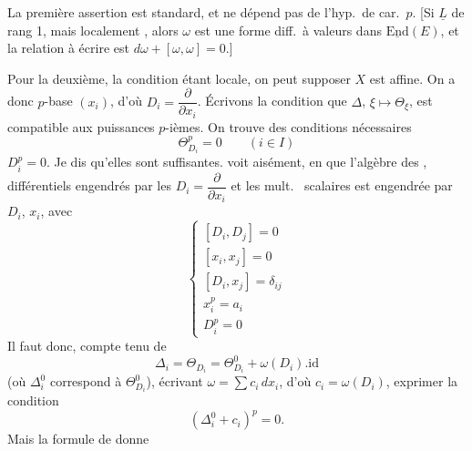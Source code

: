 \documentclass[11pt,a4paper]{article}
\begin{document}
La première assertion est standard, et ne dépend pas de l'hyp.\ de car.\ $p$. [Si $\underline{L}$   de rang 1, mais  localement , alors $\omega$ est une forme diff.\ à valeurs dans $\underline{\mathrm{End}}(E)$, et la relation à écrire est $d\omega + [\omega, \omega] = 0$.]

Pour la deuxième, la condition étant locale, on peut supposer  $X$ est affine. On a donc  \ill{} \ill{}   $p$-base $(x_{i})$, d'où  $D_{i} = \dfrac{\partial}{\partial x_{i}}$.
 Écrivons la condition que $\Delta$, \struck{\ill{}}  $\xi \mapsto \Theta_{\xi}$,  est compatible aux puissances $p$-ièmes. On trouve \struck{$\Theta_{\ill{}}$} \ill{} des conditions nécessaires
\[
\Theta_{D_{i}}^{p} = 0 \qquad (i \in I)
\]
 $D_{i}^{p} = 0$. Je dis qu'elles sont suffisantes.  \struck{\ill{}}  voit aisément, en  que l'algèbre des \struck{\ill{} \ill{} \ill{} \ill{}}   , \struck{\ill{} \ill{}} \ill{} différentiels engendrés par les $D_{i} = \dfrac{\partial}{\partial x_{i}}$ et les mult.\  scalaires est engendrée par  $D_{i}$, $x_{i}$, avec 
\[
\begin{cases} [D_{i}, D_{j}] = 0 \\ [x_{i}, x_{j}] = 0 \\ [D_{i}, x_{j}] = \delta_{ij} \\ x_{i}^{p} = a_{i} \\ D_{i}^{p} = 0 \end{cases}
\]
Il faut donc, compte tenu de
\[
\Delta_{i} = \Theta_{D_{i}} = \Theta^{0}_{D_{i}} + \omega(D_{i}).\mathrm{id}
\]
(où $\Delta^{0}_{i}$ correspond à $\Theta^{0}_{D_{i}}$), écrivant $\omega = \sum c_{i}\,dx_{i}$, d'où $c_{i} = \omega(D_{i})$, exprimer la condition
\[
(\Delta^{0}_{i} + c_{i})^{p} = 0 .
\]
Mais la formule de  donne
\end{document}
